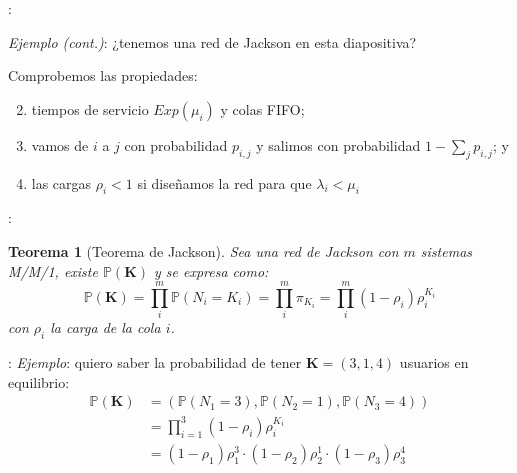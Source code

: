\documentclass[xcolor={x11names}]{beamer}
\newcommand{\cmark}{\ding{51}}%
\newtheorem{thm}{Teorema}[section] %
\begin{document}
\begin{frame}{\secname: \subsecname}

    \textit{Ejemplo (cont.)}: ¿tenemos una red
    de Jackson en esta diapositiva?

    \begin{figure}
        \resizebox{.7\textwidth}{!}{%
            
        }
    \end{figure}

    Comprobemos las propiedades:
    \begin{enumerate}
        \setcounter{enumi}{1}
        \item \cmark tiempos de servicio
            $Exp(\mu_i)$ y colas FIFO;
        \item \cmark vamos de $i$ a $j$
            con probabilidad $p_{i,j}$
            y salimos con probabilidad
            $1-\sum_j p_{i,j}$; y
        \item \cmark las cargas $\rho_i<1$
            si diseñamos la red para
            que $\lambda_i<\mu_i$
    \end{enumerate}
\end{frame}




\begin{frame}{\secname: \subsecname}
    \begin{thm}[Teorema de Jackson]
        Sea una red de Jackson con $m$ sistemas
        M/M/1, existe $\mathbb{P}(\mathbf{K})$
        y se expresa como:
        \begin{equation}
            \mathbb{P}(\mathbf{K})
            =\prod_i^m\mathbb{P}(N_i=K_i)\nonumber
            =\prod_i^m\pi_{K_i}
            =\prod_i^m(1-\rho_i)\rho_i^{K_i}
        \end{equation}
        con $\rho_i$ la carga de la cola $i$.
    \end{thm}
\end{frame}


\begin{frame}{\secname: \subsecname}
    \textit{Ejemplo}:
    quiero saber la probabilidad de tener
    $\mathbf{K}=(3,1,4)$ usuarios en
    equilibrio:
    \begin{align*}
        \mathbb{P}(\mathbf{K})&=
        \left(\mathbb{P}(N_1=3),
        \mathbb{P}(N_2=1),
        \mathbb{P}(N_3=4)\right)\\
        &=\prod_{i=1}^3 (1-\rho_i)\rho_i^{K_i}\\
        &=(1-\rho_1)\rho_1^3\cdot
        (1-\rho_2)\rho_2^1 \cdot
        (1-\rho_3)\rho_3^4
    \end{align*}

    \vfill

    \begin{figure}
        \resizebox{.7\textwidth}{!}{%
            
        }
    \end{figure}
\end{frame}
\end{document}
